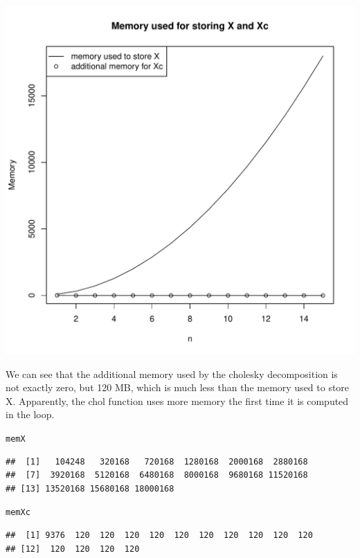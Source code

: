 \documentclass{llncs}\usepackage[]{graphicx}\usepackage[]{color}
\makeatletter
\def\maxwidth{ %
  \ifdim\Gin@nat@width>\linewidth
    \linewidth
  \else
    \Gin@nat@width
  \fi
}
\newcommand{\hlstd}[1]{\textcolor[rgb]{0.345,0.345,0.345}{#1}}%
\newenvironment{kframe}{%
 \def\at@end@of@kframe{}%
 \ifinner\ifhmode%
  \def\at@end@of@kframe{\end{minipage}}%
  \begin{minipage}{\columnwidth}%
 \fi\fi%
 \def\FrameCommand##1{\hskip\@totalleftmargin \hskip-\fboxsep
 \colorbox{shadecolor}{##1}\hskip-\fboxsep
     \hskip-\linewidth \hskip-\@totalleftmargin \hskip\columnwidth}%
 \MakeFramed {\advance\hsize-\width
   \@totalleftmargin\z@ \linewidth\hsize
   \@setminipage}}%
 {\par\unskip\endMakeFramed%
 \at@end@of@kframe}
\newenvironment{knitrout}{}{} %
\makeatother
\begin{document}
\begin{knitrout}
\begin{kframe}
\begin{alltt}
\end{alltt}
\end{kframe}
\includegraphics[width=\maxwidth]{figure/unnamed-chunk-2-1} 

\end{knitrout}
We can see that the additional memory used by the cholesky decomposition is not exactly zero, but 120 MB, which is much less than the memory used to store X. Apparently, the chol function uses more memory the first time it is computed in the loop.
\begin{knitrout}
\color{fgcolor}\begin{kframe}
\begin{alltt}
\hlstd{memX}
\end{alltt}
\begin{lstlisting}[basicstyle=\ttfamily,breaklines=true]
##  [1]   104248   320168   720168  1280168  2000168  2880168
##  [7]  3920168  5120168  6480168  8000168  9680168 11520168
## [13] 13520168 15680168 18000168
\end{lstlisting}
\begin{alltt}
\hlstd{memXc}
\end{alltt}
\begin{lstlisting}[basicstyle=\ttfamily,breaklines=true]
##  [1] 9376  120  120  120  120  120  120  120  120  120  120
## [12]  120  120  120  120
\end{lstlisting}
\end{kframe}
\end{knitrout}
\end{document}
